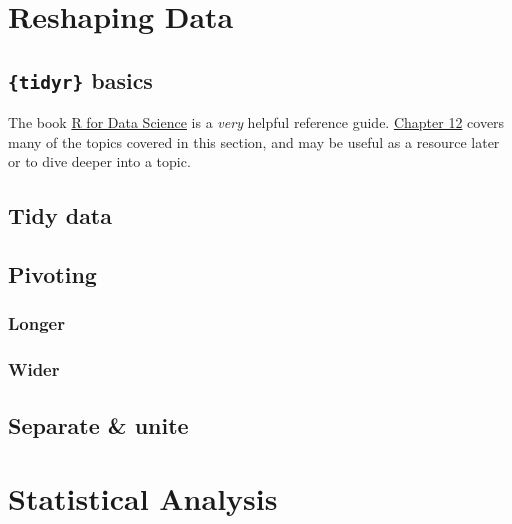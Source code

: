\documentclass[
]{book}
\begin{document}
\hypertarget{reshaping-data}{%
\chapter{Reshaping Data}\label{reshaping-data}}

\hypertarget{tidyr-basics}{%
\section*{\texorpdfstring{\texttt{\{tidyr\}} basics}{\{tidyr\} basics}}\label{tidyr-basics}}

The book \href{https://r4ds.had.co.nz/}{R for Data Science} is a \emph{very} helpful reference guide. \href{https://r4ds.had.co.nz/tidy-data.html}{Chapter 12} covers many of the topics covered in this section, and may be useful as a resource later or to dive deeper into a topic.

\hypertarget{tidy-data}{%
\section{Tidy data}\label{tidy-data}}

\hypertarget{pivoting}{%
\section{Pivoting}\label{pivoting}}

\hypertarget{longer}{%
\subsection{Longer}\label{longer}}

\hypertarget{wider}{%
\subsection{Wider}\label{wider}}

\hypertarget{separate-unite}{%
\section{Separate \& unite}\label{separate-unite}}

\hypertarget{statistical-analysis}{%
\chapter{Statistical Analysis}\label{statistical-analysis}}
\end{document}
